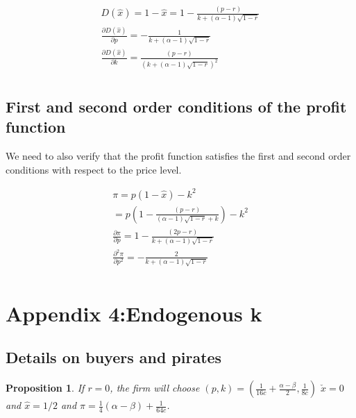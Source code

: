 \documentclass[11pt]{article}
\newtheorem{proposition}{Proposition}
\begin{document}
\begin{align*}
D(\hat{x})=1-\hat{x}=1-\frac{ (p-r)}{k + (\alpha-1) \sqrt{ 1 -r }} \\
\frac{\partial D(\hat{x})}{\partial p} =
-\frac{ 1}{k + (\alpha-1) \sqrt{ 1 -r }} \\
\frac{\partial D(\hat{x})}{\partial k} =
\frac{ (p-r) }{(k+
 (\alpha-1)\sqrt{ 1 - r }
)^2} \\
\end{align*}


\subsection{First and second order conditions of the profit function}
We need to also verify that the profit function satisfies the first and second order conditions with respect to the price level.

\begin{align*}
\pi = p\left(1-\hat{x}\right) - k^2 \\
=p\left(1-\frac{ (p-r)}{(\alpha-1)
\sqrt{ 1-r }
+k} \right) -k^2
\\
\frac{\partial \pi }{\partial p} = 1-\frac{ (2p-r)}{
k+ (\alpha-1)\sqrt{ 1 -r }} \\
\frac{\partial^2 \pi }{\partial p^2}
= -\frac{ 2}{
k+ (\alpha-1)\sqrt{ 1 -r }} \\
\end{align*}



\section{Appendix 4:Endogenous k}


\subsection{Details on buyers and pirates}

\begin{proposition}
If $r=0$, the firm will choose $(p,k)=(\frac{1}{16c}+\frac{\alpha-\beta}{2},\frac{1}{8c})$ $\check{x}=0$ and $\hat{x}=1/2$ and $\pi= \frac{1}{4}(\alpha-\beta)+\frac{1}{64c}$.
\end{proposition}
\end{document}
